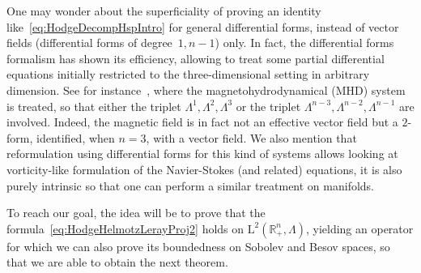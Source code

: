\documentclass[AHL,Unicode,longabstracts,published]{cedram}
\newcommand{\bbR}{\mathbb{R}}
\newcommand{\rmL}{\mathrm{L}}
\begin{document}
One may wonder about the superficiality of proving an identity like~\eqref{eq:HodgeDecompHspIntro} for general differential forms, instead of vector fields (differential forms of degree~$1,n-1$) only. In fact, the differential forms formalism has shown its efficiency, allowing to treat some partial differential equations initially restricted to the three-dimensional setting in arbitrary dimension. See for instance~\cite{Monniaux2021,Denis2022}, where the magnetohydrodynamical (MHD) system is treated, so that either the triplet $\Lambda^{1},\Lambda^{2},\Lambda^{3}$ or the triplet $\Lambda^{n-3},\Lambda^{n-2},\Lambda^{n-1}$ are involved. Indeed, the magnetic field is in fact not an effective vector field but a $2$-form, identified, when $n=3$, with a vector field. We also mention that reformulation using differential forms for this kind of systems allows looking at vorticity-like formulation of the Navier-Stokes (and related) equations, it is also purely intrinsic so that one can perform a similar treatment on manifolds.

To reach our goal, the idea will be to prove that the formula~\eqref{eq:HodgeHelmotzLerayProj2} holds on $\rmL^2(\bbR^n_+,\Lambda)$, yielding an operator for which we can also prove its boundedness on Sobolev and Besov spaces, so that we are able to obtain the next theorem.
\end{document}
